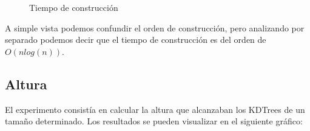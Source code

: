 \documentclass[12pt,letterpaper, margin = 3cm]{article}
\begin{document}
 \begin{figure}[ht!] \centering
 \caption{Tiempo de construcción}\label{holaquetal}
 \end{figure}

A simple vista podemos confundir el orden de construcción, pero analizando por separado podemos decir que el tiempo de construcción es del orden de $O(n log(n))$.


\newpage
\subsection{Altura}
El experimento consistía en calcular la altura que alcanzaban los KDTrees de un tamaño determinado. Los resultados se pueden visualizar en el siguiente gráfico:
\end{document}
